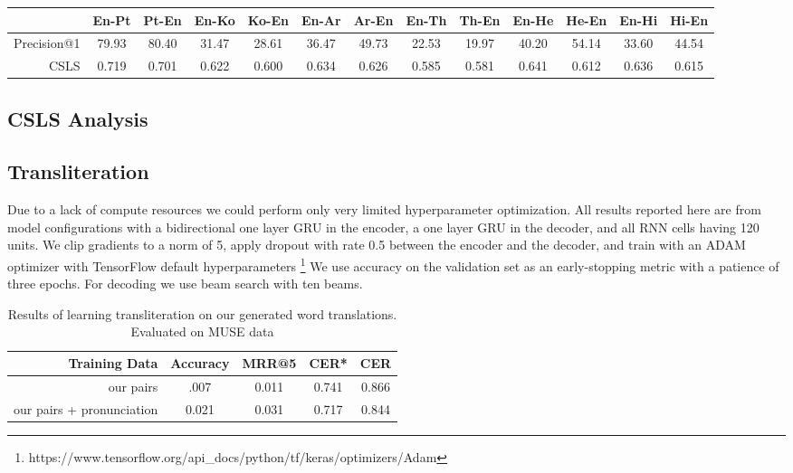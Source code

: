 \documentclass{article}
\begin{document}
\begin{table}
  \centering
  \tabcolsep=0.07cm
  \begin{tabular}{||r|cc|cc|cc|cc|cc|cc||}
    \hline
    & En-Pt & Pt-En & En-Ko & Ko-En & En-Ar & Ar-En & En-Th & Th-En
    & En-He & He-En & En-Hi & Hi-En \\
    \hline
    Precision@1 & 79.93 & 80.40 & 31.47 & 28.61 & 36.47 & 49.73 & 22.53 & 19.97
      & 40.20 & 54.14 & 33.60 & 44.54 \\
    CSLS        & 0.719 & 0.701 & 0.622 & 0.600 & 0.634 & 0.626 & 0.585 & 0.581
      & 0.641 & 0.612 & 0.636 & 0.615 \\
    \hline
  \end{tabular}
\end{table}

\subsection*{CSLS Analysis}

\subsection*{Transliteration}

Due to a lack of compute resources we could perform
only very limited hyperparameter optimization.
All results reported here are from model configurations
with a bidirectional one layer GRU in the encoder,
a one layer GRU in the decoder,
and all RNN cells having 120 units.
We clip gradients to a norm of 5,
apply dropout with rate 0.5 between the encoder and the decoder,
and train with an ADAM optimizer with TensorFlow default hyperparameters
\footnote{https://www.tensorflow.org/api\_docs/python/tf/keras/optimizers/Adam}
We use accuracy on the validation set as an early-stopping metric
with a patience of three epochs.
For decoding we use beam search with ten beams.

\begin{table}[h]
  \centering
  \begin{tabular}{r | c c c c}
    Training Data & Accuracy & MRR@5 & CER* & CER \\
    \hline
    our pairs & .007 & 0.011 & 0.741 & 0.866 \\
    our pairs + pronunciation & 0.021 & 0.031 & 0.717 & 0.844 \\
  \end{tabular}
  \caption{Results of learning transliteration on our generated word
    translations. Evaluated on MUSE data}
\end{table}
\end{document}
